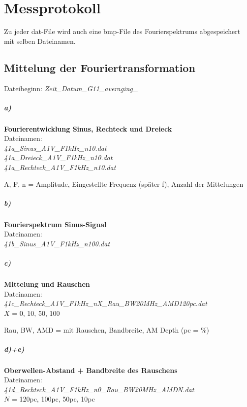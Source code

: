 
\chapter{Messprotokoll}
\label{chap:protokoll}
Zu jeder dat-File wird auch eine bmp-File des Fourierspektrums abgespeichert mit selben Dateinamen.
\section*{Mittelung der Fouriertransformation}
Dateibeginn: \textit{Zeit\_Datum\_G11\_averaging\_}
\paragraph{a)}\textbf{Fourierentwicklung Sinus, Rechteck und Dreieck}\\
Dateinamen:\\
\textit{41a\_Sinus\_A1V\_F1kHz\_n10.dat}\\
\textit{41a\_Dreieck\_A1V\_F1kHz\_n10.dat}\\
\textit{41a\_Rechteck\_A1V\_F1kHz\_n10.dat}

A, F, n = Amplitude, Eingestellte Frequenz (später f), Anzahl der Mittelungen

\paragraph{b)}\textbf{Fourierspektrum Sinus-Signal}\\
Dateinamen:\\
\textit{41b\_Sinus\_A1V\_F1kHz\_n100.dat}

\paragraph{c)}\textbf{Mittelung und Rauschen}\\
Dateinamen:\\ 
\textit{41c\_Rechteck\_A1V\_F1kHz\_nX\_Rau\_BW20MHz\_AMD120pc.dat}\\
$X$ = 0, 10, 50, 100

Rau, BW, AMD = mit Rauschen, Bandbreite, AM Depth (pc = \%)

\paragraph{d)+e)}\textbf{Oberwellen-Abstand + Bandbreite des Rauschens}\\
Dateinamen:\\
\textit{41d\_Rechteck\_A1V\_F1kHz\_n0\_Rau\_BW20MHz\_AMDN.dat} \\$N$ = 120pc, 100pc, 50pc, 10pc

